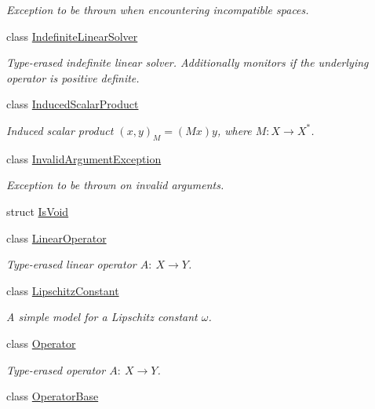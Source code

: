 \begin{DoxyCompactItemize}
\begin{DoxyCompactList}\small\item\em Exception to be thrown when encountering incompatible spaces. \end{DoxyCompactList}\item 
class \hyperlink{classSpacy_1_1IndefiniteLinearSolver}{Indefinite\+Linear\+Solver}
\begin{DoxyCompactList}\small\item\em Type-\/erased indefinite linear solver. Additionally monitors if the underlying operator is positive definite. \end{DoxyCompactList}\item 
class \hyperlink{classSpacy_1_1InducedScalarProduct}{Induced\+Scalar\+Product}
\begin{DoxyCompactList}\small\item\em Induced scalar product $(x,y)_M = (Mx)y$, where $M:X\rightarrow X^*$. \end{DoxyCompactList}\item 
class \hyperlink{classSpacy_1_1InvalidArgumentException}{Invalid\+Argument\+Exception}
\begin{DoxyCompactList}\small\item\em Exception to be thrown on invalid arguments. \end{DoxyCompactList}\item 
struct \hyperlink{structSpacy_1_1IsVoid}{Is\+Void}
\item 
class \hyperlink{classSpacy_1_1LinearOperator}{Linear\+Operator}
\begin{DoxyCompactList}\small\item\em Type-\/erased linear operator $A:\ X \to Y $. \end{DoxyCompactList}\item 
class \hyperlink{classSpacy_1_1LipschitzConstant}{Lipschitz\+Constant}
\begin{DoxyCompactList}\small\item\em A simple model for a Lipschitz constant $\omega$. \end{DoxyCompactList}\item 
class \hyperlink{classSpacy_1_1Operator}{Operator}
\begin{DoxyCompactList}\small\item\em Type-\/erased operator $A:\ X \to Y $. \end{DoxyCompactList}\item 
class \hyperlink{classSpacy_1_1OperatorBase}{Operator\+Base}

\end{DoxyCompactItemize}

